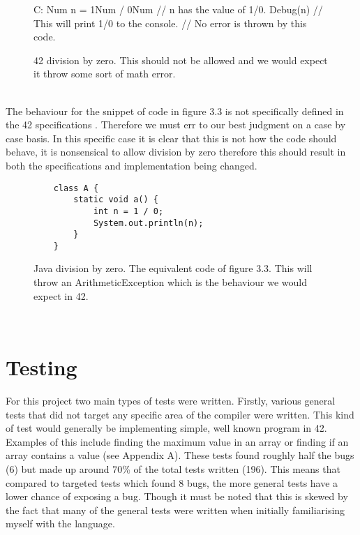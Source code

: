 \begin{figure}[h]
\begin{42listing}
	C: {
		Num n = 1Num / 0Num // n has the value of 1/0.
		Debug(n) // This will print 1/0 to the console.
	} // No error is thrown by this code.
\end{42listing}
\captionsetup{format = hang}
\caption[42 division by zero]{42 division by zero. This should not be allowed and we would expect it throw some sort of math error.}
\end{figure}
~\\
The behaviour for the snippet of code in figure 3.3 is not specifically defined in the 42 specifications \cite{L42Main}. Therefore we must err to our best judgment on a case by case basis. In this specific case it is clear that this is not how the code should behave, it is nonsensical to allow division by zero therefore this should result in both the specifications and implementation being changed.
\begin{figure}[h]
\begin{lstlisting}
	class A {
		static void a() {
			int n = 1 / 0; 
			System.out.println(n);
		}
	}
\end{lstlisting}
\captionsetup{format = hang}
\caption[Java division by zero]{Java division by zero. The equivalent code of figure 3.3. This will throw an ArithmeticException which is the behaviour we would expect in 42.}
\end{figure}

~\\

\section{Testing}

For this project two main types of tests were written. Firstly, various general tests that did not target any specific area of the compiler were written. This kind of test would generally be implementing simple, well known program in 42. Examples of this include finding the maximum value in an array or finding if an array contains a value (see Appendix A). These tests found roughly half the bugs (6) but made up around 70\% of the total tests written (196). This means that compared to targeted tests which found 8 bugs, the more general tests have a lower chance of exposing a bug. Though it must be noted that this is skewed by the fact that many of the general tests were written when initially familiarising myself with the language.

